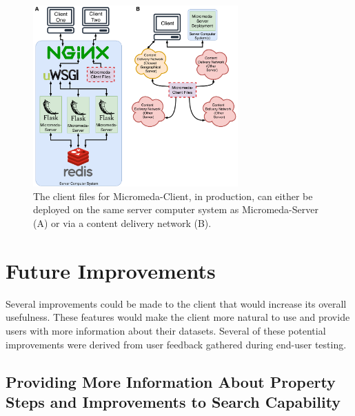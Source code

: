 \begin{figure}[!ht]
  \centering
	\includegraphics[width=0.7\textwidth]{media/micromeda-client-deployment.pdf}
	 \caption{The client files for Micromeda-Client, in production, can either be deployed on the same server computer system as Micromeda-Server (A) or via a content delivery network (B).}
	 \label{fig:client-deployment}
\end{figure}

\section{Future Improvements} \label{client-improvements}

Several improvements could be made to the client that would increase its overall usefulness. These features would make the client more natural to use and provide users with more information about their datasets. Several of these potential improvements were derived from user feedback gathered during end-user testing.

\subsection{Providing More Information About Property Steps and Improvements to Search Capability}

